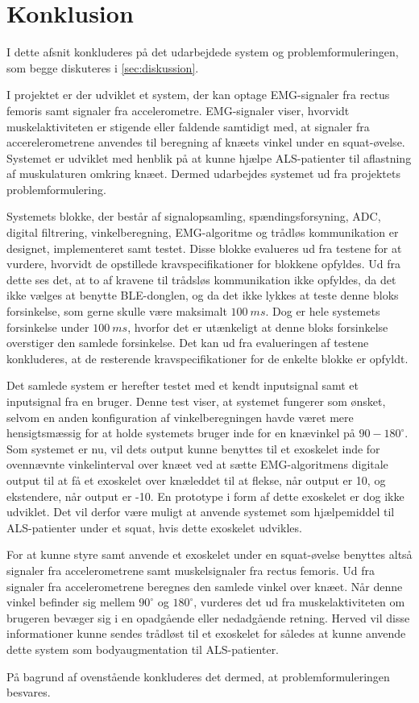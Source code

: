 \section{Konklusion}
I dette afsnit konkluderes på det udarbejdede system og problemformuleringen, som begge diskuteres i \autoref{sec:diskussion}. 

I projektet er der udviklet et system, der kan optage EMG-signaler fra rectus femoris samt signaler fra accelerometre. EMG-signaler viser, hvorvidt muskelaktiviteten er stigende eller faldende samtidigt med, at signaler fra accerelerometrene anvendes til beregning af knæets vinkel under en squat-øvelse. Systemet er udviklet med henblik på at kunne hjælpe ALS-patienter til aflastning af muskulaturen omkring knæet. Dermed udarbejdes systemet ud fra projektets problemformulering. 

Systemets blokke, der består af signalopsamling, spændingsforsyning, ADC, digital filtrering, vinkelberegning, EMG-algoritme og trådløs kommunikation er designet, implementeret samt testet. Disse blokke evalueres ud fra testene for at vurdere, hvorvidt de opstillede kravspecifikationer for blokkene opfyldes. Ud fra dette ses det, at to af kravene til trådsløs kommunikation ikke opfyldes, da det ikke vælges at benytte BLE-donglen, og da det ikke lykkes at teste denne bloks forsinkelse, som gerne skulle være maksimalt $100~ms$. Dog er hele systemets forsinkelse under $100~ms$, hvorfor det er utænkeligt at denne bloks forsinkelse overstiger den samlede forsinkelse. Det kan ud fra evalueringen af testene konkluderes, at de resterende kravspecifikationer for de enkelte blokke er opfyldt. 

Det samlede system er herefter testet med et kendt inputsignal samt et inputsignal fra en bruger. Denne test viser, at systemet fungerer som ønsket, selvom en anden konfiguration af vinkelberegningen havde været mere hensigtsmæssig for at holde systemets bruger inde for en knævinkel på $90-180^{\circ}$. Som systemet er nu, vil dets output kunne benyttes til et exoskelet inde for ovennævnte vinkelinterval over knæet ved at sætte EMG-algoritmens digitale output til at få et exoskelet over knæleddet til at flekse, når output er 10, og ekstendere, når output er -10. En prototype i form af dette exoskelet er dog ikke udviklet. Det vil derfor være muligt at anvende systemet som hjælpemiddel til ALS-patienter under et squat, hvis dette exoskelet udvikles. 

For at kunne styre samt anvende et exoskelet under en squat-øvelse benyttes altså signaler fra accelerometrene samt muskelsignaler fra rectus femoris. Ud fra signaler fra accelerometrene beregnes den samlede vinkel over knæet. Når denne vinkel befinder sig mellem  $90^{\circ}$ og $180^{\circ}$, vurderes det ud fra muskelaktiviteten om brugeren bevæger sig i en opadgående eller nedadgående retning. Herved vil disse informationer kunne sendes trådløst til et exoskelet for således at kunne anvende dette system som bodyaugmentation til ALS-patienter.

På bagrund af ovenstående konkluderes det dermed, at problemformuleringen besvares. 